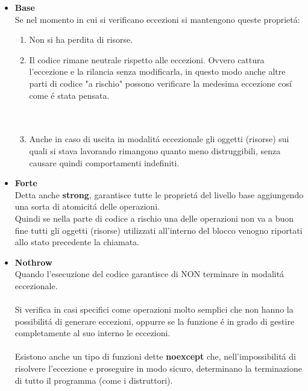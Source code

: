 \documentclass{article}
\begin{document}
\begin{itemize}
\item \textbf{\textcolor{blu}{Base}}\\Se nel momento in cui si verificano eccezioni si mantengono queste propriet\'a: \\
\begin{enumerate}
\item Non si ha perdita di risorse.
\item Il codice rimane neutrale rispetto alle eccezioni. Ovvero cattura l'eccezione e la rilancia senza modificarla, in questo modo anche altre parti di codice "a rischio" possono verificare la medesima eccezione cos\'i come \'e stata pensata. \\ \\ \\
\item Anche in caso di uscita in modalit\'a eccezionale gli oggetti (risorse) sui quali si stava lavorando rimangono quanto meno distruggibili, senza causare quindi comportamenti indefiniti. \\
\end{enumerate}
\item \textbf{\textcolor{blu}{Forte}} \\ Detta anche \textbf{strong}, garantisce tutte le propriet\'a del livello base aggiungendo una sorta di atomicit\'a delle operazioni. \\Quindi se nella parte di codice a rischio una delle operazioni non va a buon fine tutti gli oggetti (risorse) utilizzati all'interno del blocco venogno riportati allo stato precedente la chiamata.\\
\item \textbf{\textcolor{blu}{Nothrow}} \\ Quando l'esecuzione del codice garantisce di NON terminare in modalit\'a eccezionale. \\
\\Si verifica in casi specifici come operazioni molto semplici che non hanno la possibilit\'a di generare eccezioni, oppurre se la funzione \'e in grado di gestire completamente al suo interno le eccezioni. \\ 
\\Esistono anche un tipo di funzioni dette \textbf{noexcept} che, nell'impossibilit\'a di risolvere l'eccezione e proseguire in modo sicuro, determinano la terminazione di tutto il programma (come i distruttori).
\\ \\ \\ \\
\end{itemize} 
\end{document}
